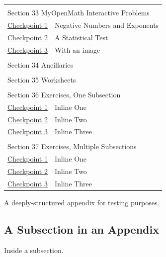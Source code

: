 \documentclass{sn-jnl}
\theoremstyle{thmstyleone}%
\theoremstyle{thmstyletwo}%
\theoremstyle{thmstylethree}%
\numberwithin{equation}{section}
\begin{document}
\begin{appendices}
\begin{longtable}[l]{ll}
\multicolumn{2}{l}{\null}\\[1.5ex] \multicolumn{2}{l}{\large Section 33 MyOpenMath Interactive Problems}\\[0.5ex]
\hyperref[section-myopenmath-3]{Checkpoint 1}& Negative Numbers and Exponents\\
\hyperref[section-myopenmath-4]{Checkpoint 2}& A Statistical Test\\
\hyperref[section-myopenmath-5]{Checkpoint 3}& With an image\\
\multicolumn{2}{l}{\null}\\[1.5ex] \multicolumn{2}{l}{\large Section 34 Ancillaries}\\[0.5ex]
\multicolumn{2}{l}{\null}\\[1.5ex] \multicolumn{2}{l}{\large Section 35 Worksheets}\\[0.5ex]
\multicolumn{2}{l}{\null}\\[1.5ex] \multicolumn{2}{l}{\large Section 36 Exercises, One Subsection}\\[0.5ex]
\hyperref[section-exercises-single-5]{Checkpoint 1}& Inline One\\
\hyperref[duplicate-inline]{Checkpoint 2}& Inline Two\\
\hyperref[section-exercises-single-9]{Checkpoint 3}& Inline Three\\
\multicolumn{2}{l}{\null}\\[1.5ex] \multicolumn{2}{l}{\large Section 37 Exercises, Multiple Subsections}\\[0.5ex]
\hyperref[section-exercises-multiple-3-2]{Checkpoint 1}& Inline One\\
\hyperref[section-exercises-multiple-3-4]{Checkpoint 2}& Inline Two\\
\hyperref[exercise-duplicate-inline]{Checkpoint 3}& Inline Three\\
\end{longtable}
%
%
\typeout{************************************************}
\typeout{************************************************}
%
\label{appendix-structured}%
A deeply-structured appendix for testing purposes.%
%
%
\typeout{************************************************}
\typeout{************************************************}
%
\subsection{A Subsection in an Appendix}\label{appendix-structured-3}%
Inside a subsection.%
%
%
\typeout{************************************************}
\typeout{************************************************}
%

\end{appendices}
\end{document}
